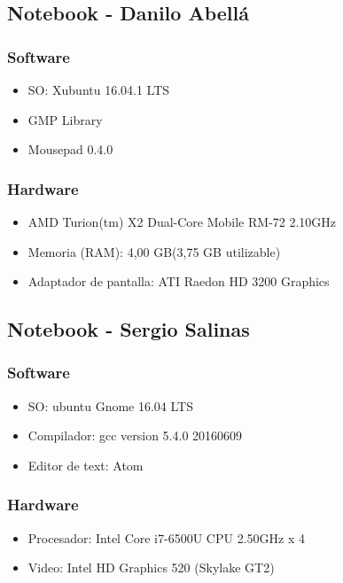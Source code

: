 \documentclass[12pt,letterpaper]{scrartcl}
\begin{document}
\subsection{ Notebook - Danilo Abellá}
\subsubsection{Software}
\begin{itemize}
	\item SO: Xubuntu 16.04.1 LTS
	\item GMP Library
	\item Mousepad 0.4.0
\end{itemize}

\subsubsection{Hardware}
\begin{itemize}
	\item AMD Turion(tm) X2 Dual-Core Mobile RM-72 2.10GHz
	\item Memoria (RAM): 4,00 GB(3,75 GB utilizable)
	\item Adaptador de pantalla: ATI Raedon HD 3200 Graphics
\end{itemize}



\subsection{Notebook - Sergio Salinas}
\subsubsection{Software}
\begin{itemize}
	\item  SO: ubuntu Gnome 16.04 LTS
	\item Compilador: gcc version 5.4.0 20160609
	\item Editor de text: Atom
\end{itemize}

\subsubsection{Hardware}
\begin{itemize}
	\item Procesador: Intel Core i7-6500U CPU  2.50GHz x 4
	\item Video: Intel HD Graphics 520 (Skylake GT2)
\end{itemize}
\end{document}
